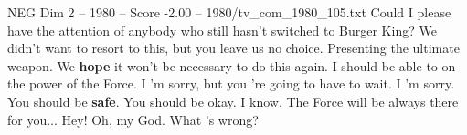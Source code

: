 \begin{textsample}{NEG Dim 2 – 1980 – Score -2.00 – 1980/tv\_com\_1980\_105.txt}  \label{ex:f2_neg_026}
Could I please have the attention of anybody who still hasn't switched to Burger King?
We didn't want to resort to this, but you leave us no choice.
Presenting the ultimate weapon.
We \textbf{hope} it won't be necessary to do this again.
I should be able to on the power of the Force.
I 'm sorry, but you 're going to have to wait.
I 'm sorry.
You should be \textbf{safe}.
You should be okay.
I know.
The Force will be always there for you...
Hey!
Oh, my God.
What 's wrong?

\end{textsample}
